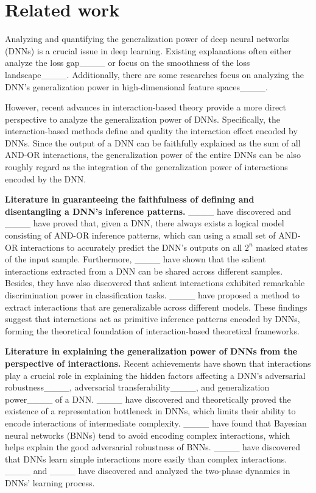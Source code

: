 \section{Related work}
Analyzing and quantifying the generalization power of deep neural networks (DNNs) is a crucial issue in deep learning. Existing explanations often either analyze the loss gap____ or focus on the smoothness of the loss landscape____. Additionally, there are some researches focus on analyzing the DNN's generalization power in high-dimensional feature spaces____.

However, recent advances in interaction-based theory provide a more direct perspective to analyze the generalization power of DNNs. Specifically, the interaction-based methods define and quality the interaction effect encoded by DNNs. Since the output of a DNN can be faithfully explained as the sum of all AND-OR interactions, the generalization power of the entire DNNs can be also roughly regard as the integration of the generalization power of interactions encoded by the DNN.

\textbf{Literature in guaranteeing the faithfulness of defining and disentangling a DNN's inference patterns.} ____ have discovered and ____ have proved that, given a DNN, there always exists a logical model consisting of AND-OR inference patterns, which can using a small set of AND-OR interactions to accurately predict the DNN's outputs on all $2^n$ masked states of the input sample. Furthermore, ____ have shown that the salient interactions extracted from a DNN can be shared across different samples. Besides, they have also discovered that salient interactions exhibited remarkable discrimination power in classification tasks. ____ have proposed a method to extract interactions that are generalizable across different models. These findings suggest that interactions act as primitive inference patterns encoded by DNNs, forming the theoretical foundation of interaction-based theoretical frameworks.

\textbf{Literature in explaining the generalization power of DNNs from the perspective of interactions.} Recent achievements have shown that interactions play a crucial role in explaining the hidden factors affecting a DNN's adversarial robustness____, adversarial transferability____, and generalization power____ of a DNN. ____ have discovered and theoretically proved the existence of a representation bottleneck in DNNs, which limits their ability to encode interactions of intermediate complexity. ____ have found that Bayesian neural networks (BNNs) tend to avoid encoding complex interactions, which helps explain the good adversarial robustness of BNNs. ____ have discovered that DNNs learn simple interactions more easily than complex interactions. ____ and ____ have discovered and analyzed the two-phase dynamics in DNNs' learning process.